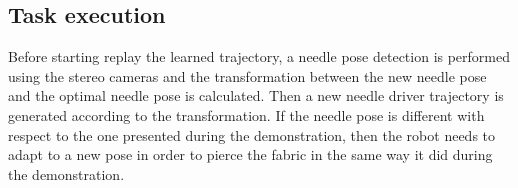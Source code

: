 \begin{figure}
\end{figure}

\subsection{Task execution}
Before starting replay the learned trajectory, a needle pose detection is performed using the stereo cameras and the transformation between the new needle pose and the optimal needle pose is calculated. Then a new needle driver trajectory is generated according to the transformation. If the needle pose is different with respect to the one presented during the demonstration, then the robot needs to adapt to a new pose in order to pierce the fabric in the same way it did during the demonstration.

